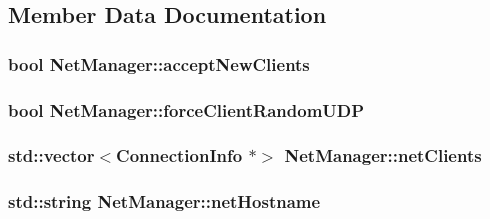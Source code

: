 \subsection{Member Data Documentation}
\hypertarget{classNetManager_a67d25cdb043a462709f1d29e071a5ce8}{
\subsubsection[{accept\-New\-Clients}]{\setlength{\rightskip}{0pt plus 5cm}bool Net\-Manager\-::accept\-New\-Clients\hspace{0.3cm}{\ttfamily [private]}}}\label{classNetManager_a67d25cdb043a462709f1d29e071a5ce8}
\hypertarget{classNetManager_a2e5fedf3835e7c392ccb8b1a23ade8d4}{
\subsubsection[{force\-Client\-Random\-U\-D\-P}]{\setlength{\rightskip}{0pt plus 5cm}bool Net\-Manager\-::force\-Client\-Random\-U\-D\-P\hspace{0.3cm}{\ttfamily [private]}}}\label{classNetManager_a2e5fedf3835e7c392ccb8b1a23ade8d4}
\hypertarget{classNetManager_abe03f819c3ef02b983881db39e162003}{
\subsubsection[{net\-Clients}]{\setlength{\rightskip}{0pt plus 5cm}std\-::vector$<${\bf Connection\-Info} $\ast$$>$ Net\-Manager\-::net\-Clients\hspace{0.3cm}{\ttfamily [private]}}}\label{classNetManager_abe03f819c3ef02b983881db39e162003}
\hypertarget{classNetManager_ad3817c547216aaf6acddabc1d2944c01}{
\subsubsection[{net\-Hostname}]{\setlength{\rightskip}{0pt plus 5cm}std\-::string Net\-Manager\-::net\-Hostname\hspace{0.3cm}{\ttfamily [private]}}}\label{classNetManager_ad3817c547216aaf6acddabc1d2944c01}
